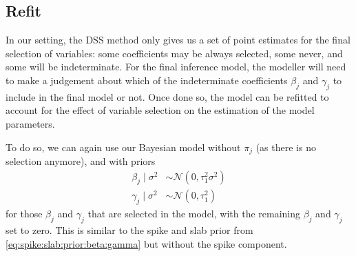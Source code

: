 \documentclass[preprint,12pt]{elsarticle}
\begin{document}

\subsection{Refit}

In our setting, the DSS method only gives us a set of point estimates for the final selection of variables: some coefficients may be always selected, some never, and some will be indeterminate. For the final inference model, the modeller will need to make a judgement about which of the indeterminate coefficients $\beta_j$ and $\gamma_j$ to include in the final model or not. Once done so, the model can be refitted to account for the effect of variable selection on the estimation of the model parameters.

To do so, we can again use our Bayesian model without $\pi_j$ (as there is no selection anymore), and with priors
\begin{align}
\beta_j\mid\sigma^2&\sim\mathcal{N}(0,\tau_1^2\sigma^2) \\
\gamma_j\mid\sigma^2&\sim\mathcal{N}(0,\tau_1^2)
\end{align}
for those $\beta_j$ and $\gamma_j$ that are selected in the model, with the remaining $\beta_j$ and $\gamma_j$ set to zero.
This is similar to the spike and slab prior from \cref{eq:spike:slab:prior:beta:gamma} but without the spike component.
\end{document}
